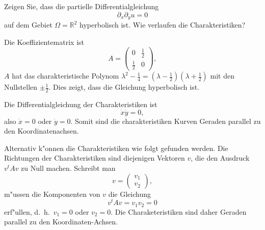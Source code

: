 Zeigen Sie, dass die partielle Differentialgleichung
\[
\partial_x\partial_y u=0
\]
auf dem Gebiet $\Omega=\mathbb R^2$ hyperbolisch ist.
Wie verlaufen die Charakteristiken?

\begin{loesung}
Die Koeffizientematrix ist
\[
A=\begin{pmatrix}0&\frac12\\\frac12&0\end{pmatrix},
\]
$A$ hat das charakteristische Polynom
$\lambda^2-\frac14=(\lambda-\frac12)(\lambda+\frac12)$ mit den Nullstellen
$\pm\frac12$. Dies zeigt, dass die Gleichung hyperbolisch ist.

Die Differentialgleichung der Charakteristiken ist
\[
\dot x\dot y=0,
\]
also $\dot x=0$ oder $\dot y=0$. Somit sind die charakteristiken Kurven
Geraden parallel zu den Koordinatenachsen.

Alternativ k"onnen die Charakteristiken wie folgt gefunden werden.
Die Richtungen der Charakteristiken sind diejenigen Vektoren $v$, die
den Ausdruck $v^tAv$ zu Null machen. Schreibt man
\[
v=\begin{pmatrix}v_1\\v_2\end{pmatrix},
\]
m"ussen die Komponenten von $v$ die Gleichung
\[
v^tAv=v_1v_2=0
\]
erf"ullen, d.~h.~$v_1=0$ oder $v_2=0$. Die Charaketeristiken sind daher
Geraden parallel zu den Koordinaten-Achsen.
\end{loesung}


